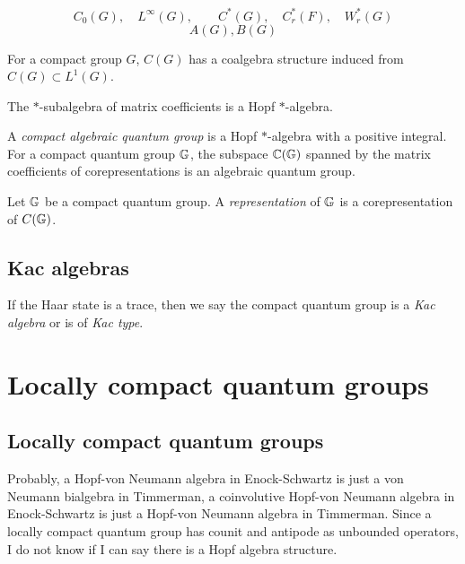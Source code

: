 \documentclass{../../large}
\begin{document}
\[C_0(G),\quad L^\infty(G),\qquad C^*(G),\quad C_r^*(F),\quad W_r^*(G)\]
\[A(G), B(G)\]

For a compact group $G$, $C(G)$ has a coalgebra structure induced from $C(G)\subset L^1(G)$.

\begin{prb}
The $*$-subalgebra of matrix coefficients is a Hopf $*$-algebra.

\end{prb}


\begin{prb}
A \emph{compact algebraic quantum group} is a Hopf $*$-algebra with a positive integral.
For a compact quantum group $\mathbb{G}$, the subspace $\mathbb{C}(\mathbb{G})$ spanned by the matrix coefficients of corepresentations is an algebraic quantum group.
\end{prb}



\begin{prb}
Let $\mathbb{G}$ be a compact quantum group.
A \emph{representation} of $\mathbb{G}$ is a corepresentation of $C(\mathbb{G})$.
\end{prb}

\section{Kac algebras}

\begin{prb}
If the Haar state is a trace, then we say the compact quantum group is a \emph{Kac algebra} or is of \emph{Kac type}.
\end{prb}



\chapter{Locally compact quantum groups}

\section{Locally compact quantum groups}


Probably, a Hopf-von Neumann algebra in Enock-Schwartz is just a von Neumann bialgebra in Timmerman, a coinvolutive Hopf-von Neumann algebra in Enock-Schwartz is just a Hopf-von Neumann algebra in Timmerman.
Since a locally compact quantum group has counit and antipode as unbounded operators, I do not know if I can say there is a Hopf algebra structure.
\end{document}
